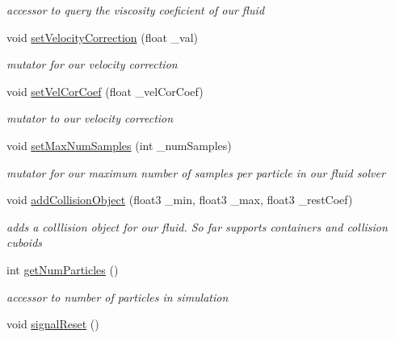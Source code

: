 \begin{DoxyCompactItemize}
\begin{DoxyCompactList}\small\item\em accessor to query the viscosity coeficient of our fluid \end{DoxyCompactList}\item 
void \hyperlink{class_s_p_h_engine_a25796b907bd55473b09ac5683918c0c5}{set\-Velocity\-Correction} (float \-\_\-val)
\begin{DoxyCompactList}\small\item\em mutator for our velocity correction \end{DoxyCompactList}\item 
\hypertarget{class_s_p_h_engine_a6b418198ceab591b1abfa5f645dbc9d7}{void \hyperlink{class_s_p_h_engine_a6b418198ceab591b1abfa5f645dbc9d7}{set\-Vel\-Cor\-Coef} (float \-\_\-vel\-Cor\-Coef)}\label{class_s_p_h_engine_a6b418198ceab591b1abfa5f645dbc9d7}

\begin{DoxyCompactList}\small\item\em mutator to our velocity correction \end{DoxyCompactList}\item 
void \hyperlink{class_s_p_h_engine_aad9d9bc9a1a7e5f64a5e045c339f8b3e}{set\-Max\-Num\-Samples} (int \-\_\-num\-Samples)
\begin{DoxyCompactList}\small\item\em mutator for our maximum number of samples per particle in our fluid solver \end{DoxyCompactList}\item 
void \hyperlink{class_s_p_h_engine_ae4653fd1afca1bbd4ae0c9a96f3535aa}{add\-Collision\-Object} (float3 \-\_\-min, float3 \-\_\-max, float3 \-\_\-rest\-Coef)
\begin{DoxyCompactList}\small\item\em adds a colllision object for our fluid. So far supports containers and collision cuboids \end{DoxyCompactList}\item 
\hypertarget{class_s_p_h_engine_a387ab48532ca20b2eb31319e862e243b}{int \hyperlink{class_s_p_h_engine_a387ab48532ca20b2eb31319e862e243b}{get\-Num\-Particles} ()}\label{class_s_p_h_engine_a387ab48532ca20b2eb31319e862e243b}

\begin{DoxyCompactList}\small\item\em accessor to number of particles in simulation \end{DoxyCompactList}\item 
\hypertarget{class_s_p_h_engine_a692ed8ae0cdb67f4a774fa2a94ad635f}{void \hyperlink{class_s_p_h_engine_a692ed8ae0cdb67f4a774fa2a94ad635f}{signal\-Reset} ()}\label{class_s_p_h_engine_a692ed8ae0cdb67f4a774fa2a94ad635f}


\end{DoxyCompactItemize}
